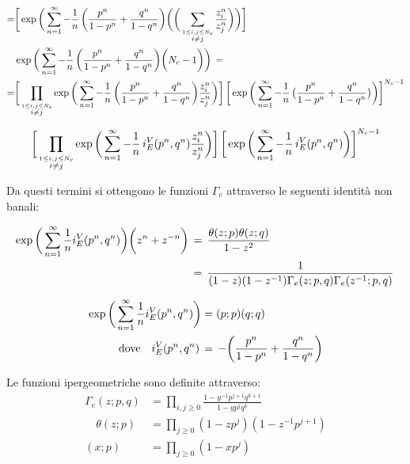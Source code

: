 \documentclass[a4paper,12pt]{article}
\begin{document}
  \begin{align*}
    =&\bigg[ \exp \bigg( \sum_{n=1}^{\infty} - {1 \over n} \, \bigg( {p^n \over 1-p^n} + {q^n \over 1-q^n} \bigg)  \bigg( \bigg( \sum_{\overset{ 1 \leq i,j \leq N_c}{i \neq j}}  {z_i^n \over z_j^n} \bigg) \bigg)\bigg] \\
	&    \exp \bigg( \sum_{n=1}^{\infty} - {1 \over n} \, \bigg( {p^n \over 1-p^n} + {q^n \over 1-q^n} \bigg)  \bigg( N_c - 1 \bigg) \bigg) \, = \\
=& \bigg[\prod_{\overset{ 1 \leq i,j \leq N_c}{i\neq j}} \exp \bigg( \sum_{n=1}^{\infty} - {1 \over n} \, \bigg( {p^n \over 1-p^n} + {q^n \over 1-q^n} \bigg)   {z_i^n \over z_j^n}\bigg) \bigg] \,  
\bigg[ \exp \bigg( \sum_{n=1}^{\infty} - {1 \over n} \, \big( {p^n \over 1-p^n} + {q^n \over 1-q^n} \big) \bigg) \bigg] ^{N_c-1}
\end{align*}

\begin{equation}
\bigg[\prod_{\overset{ 1 \leq i,j \leq N_c}{i\neq j}} \exp \bigg( \sum_{n=1}^{\infty} - {1 \over n} \, i_E^V(p^n,q^n)  {z_i^n \over z_j^n}\bigg) \bigg] \,  
\bigg[ \exp \bigg( \sum_{n=1}^{\infty} - {1 \over n} \,  i_E^V(p^n,q^n) \bigg) \bigg] ^{N_c-1}
\end{equation}

Da questi termini si ottengono le funzioni $\Gamma_e$ attraverso le seguenti identità non banali:

\begin{align}
\exp \bigg( \sum_{n=1}^{\infty} {1 \over n} i_E^{V} (p^n,q^n) \bigg) \bigg( z^n + z^{-n} \bigg) \,& = 
\,  \frac{ \theta ( z;p) \theta (z;q) }{ 1-z^2 } \\
& =  \, \frac{1}{ ( 1 - z ) ( 1 - z^{-1}) \Gamma_e( z;p,q) \Gamma_e( z^{-1}; p,q)} \, 
\label{Gamma_eVectorAdjoint} 
\end{align}

\begin{align}
  \exp \bigg( \sum_{n=1}^{\infty} {1 \over n} i_E^{V} (p^n,q^n) \bigg)  &= (p;p) (q;q) \,
  \label{Gamma_eVector} \\
 \mbox{dove} \quad i_E^V(p^n,q^n) \, &= \, - \bigg( {p^n \over 1-p^n} + {q^n \over 1-q^n} \bigg) 
\end{align}

 Le funzioni ipergeometriche sono definite attraverso:
 $$
 \begin{aligned}
   \Gamma_e (z;p,q) &= \prod_{i,j \geq 0} \frac{ 1 - y^{-1} p^{j+1} q^{k+1}}{ 1 - y p^j q^k}\\
  \quad \theta(z;p) &= \prod_{j \geq 0 } (1- z p^j) ( 1- z^{-1}p^{j+1}) \\
  (x;p) &= \prod_{j \geq 0} ( 1- xp^j)
  \end{aligned}
$$
\end{document}

